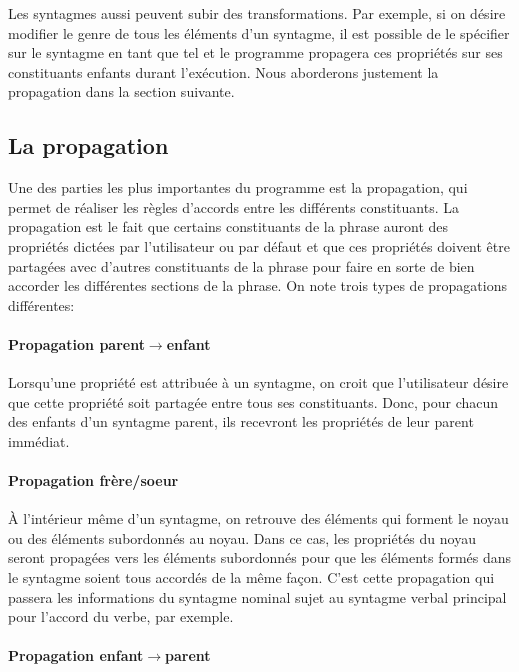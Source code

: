 \documentclass[11pt]{article} %
\begin{document}
Les syntagmes aussi peuvent subir des transformations. Par exemple,
si on désire modifier le genre de tous les éléments d'un syntagme,
il est possible de le spécifier sur le syntagme en tant que tel et
le programme propagera ces propriétés sur ses constituants enfants
durant l'exécution. Nous aborderons justement la propagation dans
la section suivante.

\subsection{La propagation}

Une des parties les plus importantes du programme est la propagation,
qui permet de réaliser les règles d'accords entre les différents constituants.
La propagation est le fait que certains constituants de la phrase
auront des propriétés dictées par l'utilisateur ou par défaut et que
ces propriétés doivent être partagées avec d'autres constituants de
la phrase pour faire en sorte de bien accorder les différentes sections
de la phrase. On note trois types de propagations différentes:

\paragraph{Propagation parent$\rightarrow$enfant}

Lorsqu'une propriété est attribuée à un syntagme, on croit que l'utilisateur
désire que cette propriété soit partagée entre tous ses constituants.
Donc, pour chacun des enfants d'un syntagme parent, ils recevront
les propriétés de leur parent immédiat.

\paragraph{Propagation frère/soeur}

À l'intérieur même d'un syntagme, on retrouve des éléments qui forment
le noyau ou des éléments subordonnés au noyau. Dans ce cas, les propriétés
du noyau seront propagées vers les éléments subordonnés pour que les
éléments formés dans le syntagme soient tous accordés de la même façon.
C'est cette propagation qui passera les informations du syntagme nominal
sujet au syntagme verbal principal pour l'accord du verbe, par exemple. 

\paragraph{Propagation enfant$\rightarrow$parent}
\end{document}
